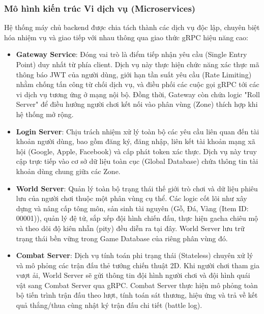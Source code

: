 \documentclass[../Project.tex]{subfiles}
\begin{document}
\subsubsection{Mô hình kiến trúc Vi dịch vụ (Microservices)}
Hệ thống máy chủ backend được chia tách thành các dịch vụ độc lập, chuyên biệt hóa nhiệm vụ và giao tiếp với nhau thông qua giao thức gRPC hiệu năng cao:
\begin{itemize}
    \item \textbf{Gateway Service}: Đóng vai trò là điểm tiếp nhận yêu cầu (Single Entry Point) duy nhất từ phía client. Dịch vụ này thực hiện chức năng xác thực mã thông báo JWT của người dùng, giới hạn tần suất yêu cầu (Rate Limiting) nhằm chống tấn công từ chối dịch vụ, và điều phối các cuộc gọi gRPC tới các vi dịch vụ tương ứng ở mạng nội bộ. Đồng thời, Gateway còn chứa logic "Roll Server" để điều hướng người chơi kết nối vào phân vùng (Zone) thích hợp khi hệ thống mở rộng.
    \item \textbf{Login Server}: Chịu trách nhiệm xử lý toàn bộ các yêu cầu liên quan đến tài khoản người dùng, bao gồm đăng ký, đăng nhập, liên kết tài khoản mạng xã hội (Google, Apple, Facebook) và cấp phát token xác thực. Dịch vụ này truy cập trực tiếp vào cơ sở dữ liệu toàn cục (Global Database) chứa thông tin tài khoản dùng chung giữa các Zone.
    \item \textbf{World Server}: Quản lý toàn bộ trạng thái thế giới trò chơi và dữ liệu phiêu lưu của người chơi thuộc một phân vùng cụ thể. Các logic cốt lõi như xây dựng và nâng cấp tông môn, sản sinh tài nguyên (Gỗ, Đá, Vàng (Item ID: 00001)), quản lý đệ tử, sắp xếp đội hình chiến đấu, thực hiện gacha chiêu mộ và theo dõi độ kiên nhẫn (pity) đều diễn ra tại đây. World Server lưu trữ trạng thái bền vững trong Game Database của riêng phân vùng đó.
    \item \textbf{Combat Server}: Dịch vụ tính toán phi trạng thái (Stateless) chuyên xử lý và mô phỏng các trận đấu thẻ tướng chiến thuật 2D. Khi người chơi tham gia vượt ải, World Server sẽ gửi thông tin đội hình người chơi và đội hình quái vật sang Combat Server qua gRPC. Combat Server thực hiện mô phỏng toàn bộ tiến trình trận đấu theo lượt, tính toán sát thương, hiệu ứng và trả về kết quả thắng/thua cùng nhật ký trận đấu chi tiết (battle log).
\end{itemize}
\end{document}
